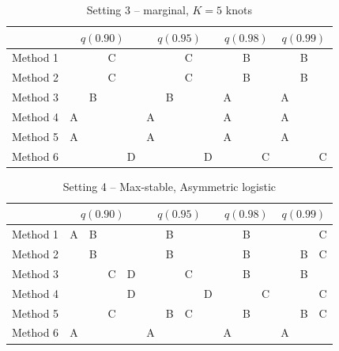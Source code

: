 \documentclass[useAMS,usenatbib,referee]{biomweb}
\begin{document}
\begin{table}[htbp]
  \centering
  \caption{Setting 3 -- \Skewt marginal, $K = 5$ knots}
  \label{sttbl:st5sim}
  \begin{tabular}{|l|cccc|cccc|ccc|ccc|}
    \cline{2-15}
    \multicolumn{1}{c}{} & \multicolumn{4}{|c}{$q(0.90)$} & \multicolumn{4}{|c}{$q(0.95)$} & \multicolumn{3}{|c}{$q(0.98)$} & \multicolumn{3}{|c|}{$q(0.99)$} \\
    \hline
    Method 1 &   &   & C &   &   &   & C &   &   & B &   &   & B &   \\
    \hline
    Method 2 &   &   & C &   &   &   & C &   &   & B &   &   & B &   \\
    \hline
    Method 3 &   & B &   &   &   & B &   &   & A &   &   & A &   &   \\
    \hline
    Method 4 & A &   &   &   & A &   &   &   & A &   &   & A &   &   \\
    \hline
    Method 5 & A &   &   &   & A &   &   &   & A &   &   & A &   &   \\
    \hline
    Method 6 &   &   &   & D &   &   &   & D &   &   & C &   &   & C \\
    \hline
  \end{tabular}
\end{table}

\begin{table}[htbp]
  \centering
  \caption{Setting 4 -- Max-stable, Asymmetric logistic}
  \label{sttbl:mssim}
  \begin{tabular}{|l|cccc|cccc|ccc|ccc|}
    \cline{2-15}
    \multicolumn{1}{c}{} & \multicolumn{4}{|c}{$q(0.90)$} & \multicolumn{4}{|c}{$q(0.95)$} & \multicolumn{3}{|c}{$q(0.98)$} & \multicolumn{3}{|c|}{$q(0.99)$} \\
    \hline
    Method 1 & A & B &   &   &   & B &   &   &   & B &   &   &   & C \\
    \hline
    Method 2 &   & B &   &   &   & B &   &   &   & B &   &   & B & C \\
    \hline
    Method 3 &   &   & C & D &   &   & C &   &   & B &   &   & B &   \\
    \hline
    Method 4 &   &   &   & D &   &   &   & D &   &   & C &   &   & C \\
    \hline
    Method 5 &   &   & C &   &   & B & C &   &   & B &   &   & B & C \\
    \hline
    Method 6 & A &   &   &   & A &   &   &   & A &   &   & A &   &   \\
    \hline
  \end{tabular}
\end{table}
\end{document}
